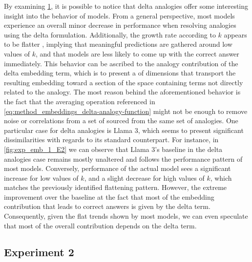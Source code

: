 By examining \cref{fig:exp_emb_1_E}, it is possible to notice that delta analogies offer some interesting insight into the behavior of models.
From a general perspective, most models experience an overall minor decrease in performance when resolving analogies using the delta formulation.
Additionally, the growth rate according to $k$ appears to be flatter , implying that meaningful predictions are gathered around low values of $k$, and that models are less likely to come up with the correct answer  immediately.
This behavior can be ascribed to the analogy contribution of the delta embedding term, which is  to present a  of dimensions that transport the resulting embedding toward a section of the space containing terms not directly related to the analogy.
The most  reason behind the aforementioned behavior is the fact that the averaging operation referenced in \cref{eq:method_embeddings_delta-analogy-function} might not be enough to remove noise or  correlations from a set of  sourced from the same set of analogies.
One particular case for delta analogies is Llama 3, which seems to present significant dissimilarities with regards to its standard counterpart.
For instance, in \cref{fig:exp_emb_1_E2} we can observe that Llama 3's baseline in the delta analogies case remains mostly unaltered and follows the performance pattern of most models.
Conversely,  performance of the actual model sees a significant increase for low values of $k$, and a slight decrease for high values of $k$, which matches the previously identified flattening pattern.
However, the extreme improvement over the baseline  at the fact that most of the embedding contribution that leads to correct answers is given by the delta term.
Consequently, given the flat trends shown by most models, we can even speculate that most of the overall contribution depends on the delta term.

\begin{figure}[t!]
    \centering
    \caption{}
    \label{fig:exp_emb_1_E}
\end{figure}

\subsection{Experiment 2}\label{ssec:exp_emb_exp2}

